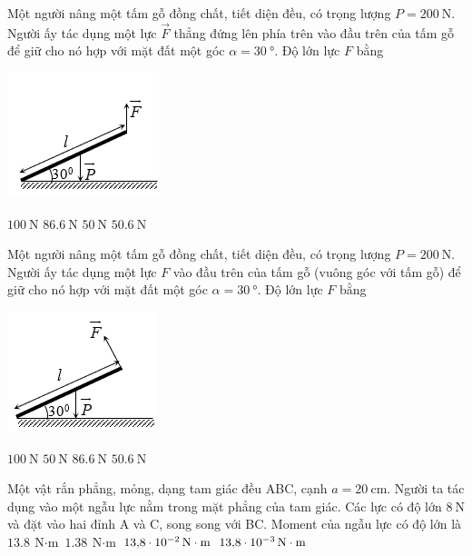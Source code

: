 \begin{ex}
	Một người nâng một tấm gỗ đồng chất, tiết diện đều, có trọng lượng $P=\SI{200}{\newton}$. Người ấy tác dụng một lực $\vec F$ thẳng đứng lên phía trên vào đầu trên của tấm gỗ để giữ cho nó hợp với mặt đất một góc $\alpha=\SI{30}{\degree}$. Độ lớn lực $F$ bằng	
	\begin{center}
		\includegraphics[width=0.25\linewidth]{../figs/VN10-2023-PH-TP0005-5}
	\end{center}
	\choice
	{\True $\SI{100}{\newton}$}
	{$\SI{86.6}{\newton}$}
	{$\SI{50}{\newton}$}
	{$\SI{50.6}{\newton}$}
\end{ex}
\begin{ex}
	Một người nâng một tấm gỗ đồng chất, tiết diện đều, có trọng lượng $P=\SI{200}{\newton}$. Người ấy tác dụng một lực $F$ vào đầu trên của tấm gỗ (vuông góc với tấm gỗ) để giữ cho nó hợp với mặt đất một góc $\alpha=\SI{30}{\degree}$. Độ lớn lực $F$ bằng 
	\begin{center}
		\includegraphics[width=0.25\linewidth]{../figs/VN10-2023-PH-TP0005-6}
	\end{center}
	\choice
	{$\SI{100}{\newton}$}
	{$\SI{50}{\newton}$}
	{\True $\SI{86.6}{\newton}$}
	{$\SI{50.6}{\newton}$}
\end{ex}
\begin{ex}
	Một vật rắn phẳng, mỏng, dạng tam giác đều ABC, cạnh $a=\SI{20}{\centi\meter}$. Người ta tác dụng vào một ngẫu lực nằm trong mặt phẳng của tam giác. Các lực có độ lớn $\SI{8}{\newton}$ và đặt vào hai đỉnh A và C, song song với BC. Moment của ngẫu lực có độ lớn là
	\choice
	{$\SI{13.8}{\newton\cdot\meter}$}
	{\True $\SI{1.38}{\newton\cdot\meter}$}
	{$\SI{13.8E-2}{\newton\cdot\meter}$}
	{$\SI{13.8E-3}{\newton\cdot\meter}$}
\end{ex}
